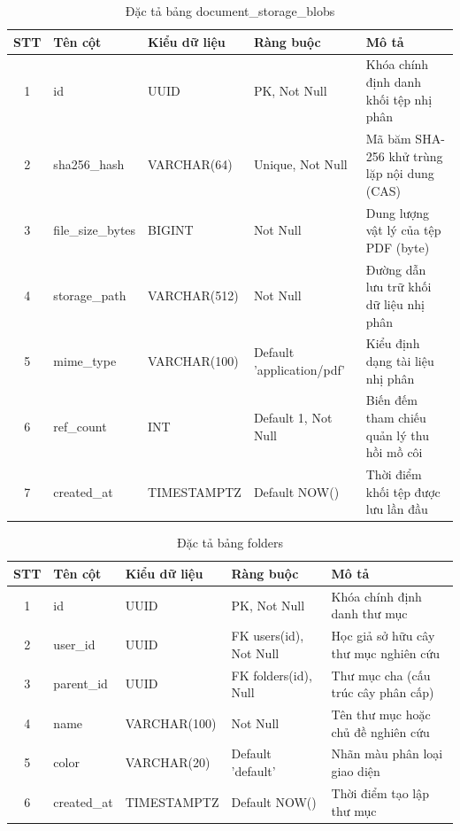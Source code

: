 \begin{table}[H]
\centering
\singlespacing
\fontsize{9pt}{11.5pt}\selectfont
\caption{Đặc tả bảng document\_storage\_blobs}
\label{tab:app_blobs}
\renewcommand{\arraystretch}{0.65}
\begin{tabularx}{\textwidth}{|c|>{\raggedright\arraybackslash}p{3.2cm}|>{\raggedright\arraybackslash}p{2.6cm}|>{\raggedright\arraybackslash}p{3.0cm}|>{\raggedright\arraybackslash}X|}
\hline
\textbf{STT} & \centering\textbf{Tên cột} & \centering\textbf{Kiểu dữ liệu} & \centering\textbf{Ràng buộc} & \centering\textbf{Mô tả} \tabularnewline \hline
1 & id & UUID & PK, Not Null & Khóa chính định danh khối tệp nhị phân \tabularnewline \hline
2 & sha256\_hash & VARCHAR(64) & Unique, Not Null & Mã băm SHA-256 khử trùng lặp nội dung (CAS) \tabularnewline \hline
3 & file\_size\_bytes & BIGINT & Not Null & Dung lượng vật lý của tệp PDF (byte) \tabularnewline \hline
4 & storage\_path & VARCHAR(512) & Not Null & Đường dẫn lưu trữ khối dữ liệu nhị phân \tabularnewline \hline
5 & mime\_type & VARCHAR(100) & Default 'application/pdf' & Kiểu định dạng tài liệu nhị phân \tabularnewline \hline
6 & ref\_count & INT & Default 1, Not Null & Biến đếm tham chiếu quản lý thu hồi mồ côi \tabularnewline \hline
7 & created\_at & TIMESTAMPTZ & Default NOW() & Thời điểm khối tệp được lưu lần đầu \tabularnewline \hline
\end{tabularx}
\end{table}

\begin{table}[H]
\centering
\singlespacing
\fontsize{9pt}{11.5pt}\selectfont
\caption{Đặc tả bảng folders}
\label{tab:app_folders}
\renewcommand{\arraystretch}{0.65}
\begin{tabularx}{\textwidth}{|c|>{\raggedright\arraybackslash}p{3.2cm}|>{\raggedright\arraybackslash}p{2.6cm}|>{\raggedright\arraybackslash}p{3.0cm}|>{\raggedright\arraybackslash}X|}
\hline
\textbf{STT} & \centering\textbf{Tên cột} & \centering\textbf{Kiểu dữ liệu} & \centering\textbf{Ràng buộc} & \centering\textbf{Mô tả} \tabularnewline \hline
1 & id & UUID & PK, Not Null & Khóa chính định danh thư mục \tabularnewline \hline
2 & user\_id & UUID & FK users(id), Not Null & Học giả sở hữu cây thư mục nghiên cứu \tabularnewline \hline
3 & parent\_id & UUID & FK folders(id), Null & Thư mục cha (cấu trúc cây phân cấp) \tabularnewline \hline
4 & name & VARCHAR(100) & Not Null & Tên thư mục hoặc chủ đề nghiên cứu \tabularnewline \hline
5 & color & VARCHAR(20) & Default 'default' & Nhãn màu phân loại giao diện \tabularnewline \hline
6 & created\_at & TIMESTAMPTZ & Default NOW() & Thời điểm tạo lập thư mục \tabularnewline \hline
\end{tabularx}
\end{table}

